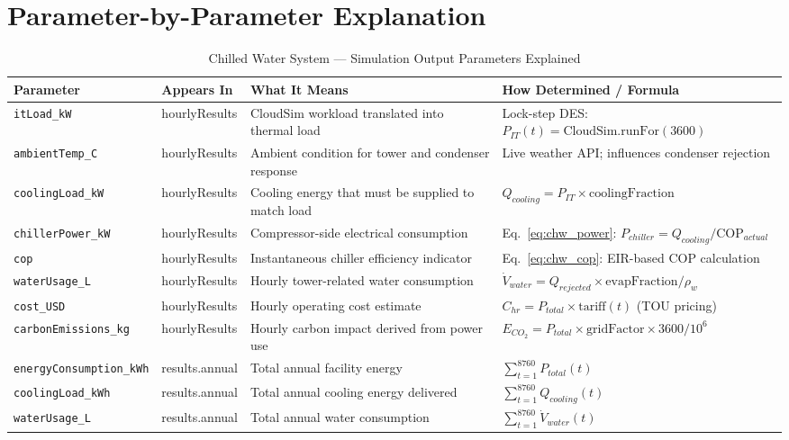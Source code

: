\documentclass[12pt,a4paper]{report}
\begin{document}
\section{Parameter-by-Parameter Explanation}

\begin{table}[H]
\centering
\caption{Chilled Water System --- Simulation Output Parameters Explained}
\label{tab:chw_params}
\renewcommand{\arraystretch}{1.3}
\scriptsize
\begin{tabular}{p{3cm}p{2.5cm}p{4.5cm}p{4.5cm}}
\toprule
\textbf{Parameter} & \textbf{Appears In} & \textbf{What It Means} & \textbf{How Determined / Formula} \\
\midrule
\texttt{itLoad\_kW} & hourlyResults & CloudSim workload translated into thermal load & Lock-step DES: $P_{IT}(t) = \text{CloudSim.runFor}(3600)$ \\
\texttt{ambientTemp\_C} & hourlyResults & Ambient condition for tower and condenser response & Live weather API; influences condenser rejection \\
\texttt{coolingLoad\_kW} & hourlyResults & Cooling energy that must be supplied to match load & $Q_{cooling} = P_{IT} \times \text{coolingFraction}$ \\
\texttt{chillerPower\_kW} & hourlyResults & Compressor-side electrical consumption & Eq.~\ref{eq:chw_power}: $P_{chiller} = Q_{cooling} / \text{COP}_{actual}$ \\
\texttt{cop} & hourlyResults & Instantaneous chiller efficiency indicator & Eq.~\ref{eq:chw_cop}: EIR-based COP calculation \\
\texttt{waterUsage\_L} & hourlyResults & Hourly tower-related water consumption & $\dot{V}_{water} = Q_{rejected} \times \text{evapFraction} / \rho_w$ \\
\texttt{cost\_USD} & hourlyResults & Hourly operating cost estimate & $C_{hr} = P_{total} \times \text{tariff}(t)$ (TOU pricing) \\
\texttt{carbonEmissions\_kg} & hourlyResults & Hourly carbon impact derived from power use & $E_{CO_2} = P_{total} \times \text{gridFactor} \times 3600 / 10^6$ \\
\texttt{energyConsumption\_kWh} & results.annual & Total annual facility energy & $\sum_{t=1}^{8760} P_{total}(t)$ \\
\texttt{coolingLoad\_kWh} & results.annual & Total annual cooling energy delivered & $\sum_{t=1}^{8760} Q_{cooling}(t)$ \\
\texttt{waterUsage\_L} & results.annual & Total annual water consumption & $\sum_{t=1}^{8760} \dot{V}_{water}(t)$ \\

\end{tabular}
\end{table}
\end{document}
